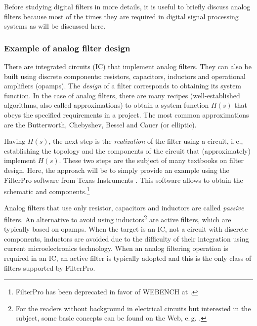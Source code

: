 Before studying digital filters in more details, it is useful to briefly discuss analog filters because most of the times they are required in digital signal processing systems as will be discussed here.

\subsubsection{Example of analog filter design}
\label{sec:analogFilterDesign}

There are integrated circuits (IC) that implement analog filters. They can also be built using discrete components: resistors, capacitors, inductors and operational amplifiers (opamps). The \emph{design} of a filter corresponds to obtaining its system function. In the case of analog filters, there are many recipes (well-established algorithms, also called approximations) to obtain a system function $H(s)$ that obeys the specified requirements in a project. The most common approximations are the Butterworth, Chebyshev, Bessel and Cauer (or elliptic).

Having $H(s)$, the next step is the \emph{realization} of the filter using a circuit, i.\,e., establishing the topology and the components of the circuit that (approximately) implement $H(s)$. These two steps are the subject of many textbooks on filter design. Here, the approach will be to simply provide an example using the FilterPro software from Texas Instruments . This software allows to obtain the schematic and components.\footnote{FilterPro has been deprecated in favor of WEBENCH at .}


Analog filters that use only resistor, capacitors and inductors are called \emph{passive} filters. An alternative to avoid using inductors\footnote{For the readers without background in electrical circuits but interested in the subject, some basic concepts can be found on the Web, e.\,g. .} 
are active filters, which are typically based on opamps. 
When the target is an IC, not a circuit with discrete components, inductors are avoided due to
the difficulty of their integration using current microelectronics technology. When an analog
 filtering operation is required in an IC, an active filter is typically adopted and this
is the only class of filters supported by FilterPro.

